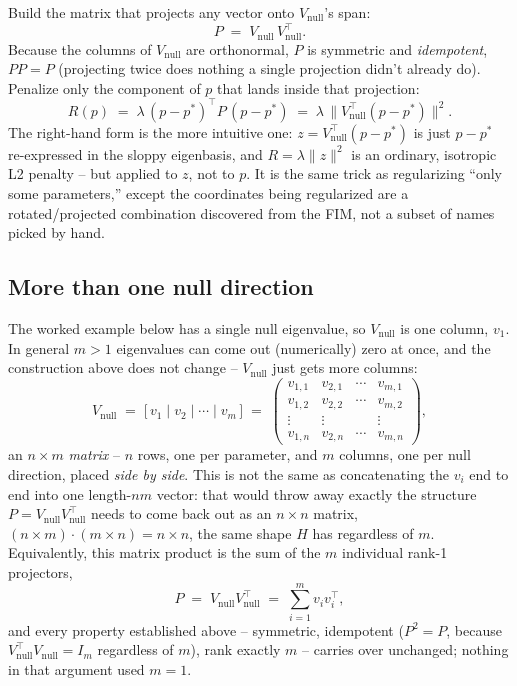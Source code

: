 \documentclass[11pt]{article}
\begin{document}
Build the matrix that projects any vector onto $V_{\mathrm{null}}$'s span:
\begin{equation}
  P \;=\; V_{\mathrm{null}}\,V_{\mathrm{null}}^\top .
\end{equation}
Because the columns of $V_{\mathrm{null}}$ are orthonormal, $P$ is symmetric
and \emph{idempotent}, $PP = P$ (projecting twice does nothing a single
projection didn't already do). Penalize only the component of $p$ that lands
inside that projection:
\begin{equation}
  R(p) \;=\; \lambda\,(p-p^*)^\top P\,(p-p^*) \;=\; \lambda\,\big\lVert V_{\mathrm{null}}^\top (p-p^*) \big\rVert^2 .
\end{equation}
The right-hand form is the more intuitive one: $z = V_{\mathrm{null}}^\top
(p-p^*)$ is just $p-p^*$ re-expressed in the sloppy eigenbasis, and $R =
\lambda\lVert z\rVert^2$ is an ordinary, isotropic L2 penalty -- but applied
to $z$, not to $p$. It is the same trick as regularizing ``only some
parameters,'' except the coordinates being regularized are a
rotated/projected combination discovered from the FIM, not a subset of names
picked by hand.

\subsection*{More than one null direction}

The worked example below has a single null eigenvalue, so $V_{\mathrm{null}}$
is one column, $v_1$. In general $m>1$ eigenvalues can come out
(numerically) zero at once, and the construction above does not change --
$V_{\mathrm{null}}$ just gets more columns:
\begin{equation}
  V_{\mathrm{null}} \;=\; \big[\,v_1 \mid v_2 \mid \cdots \mid v_m\,\big]
  \;=\;
  \begin{pmatrix}
    v_{1,1} & v_{2,1} & \cdots & v_{m,1}\\
    v_{1,2} & v_{2,2} & \cdots & v_{m,2}\\
    \vdots  & \vdots  &        & \vdots \\
    v_{1,n} & v_{2,n} & \cdots & v_{m,n}
  \end{pmatrix},
\end{equation}
an $n\times m$ \emph{matrix} -- $n$ rows, one per parameter, and $m$ columns,
one per null direction, placed \emph{side by side}. This is not the same as
concatenating the $v_i$ end to end into one length-$nm$ vector: that would
throw away exactly the structure $P=V_{\mathrm{null}}V_{\mathrm{null}}^\top$
needs to come back out as an $n\times n$ matrix, $(n\times m)\cdot(m\times
n)=n\times n$, the same shape $H$ has regardless of $m$. Equivalently, this
matrix product is the sum of the $m$ individual rank-1 projectors,
\begin{equation}
  P \;=\; V_{\mathrm{null}}V_{\mathrm{null}}^\top \;=\; \sum_{i=1}^m v_iv_i^\top,
\end{equation}
and every property established above -- symmetric, idempotent ($P^2=P$,
because $V_{\mathrm{null}}^\top V_{\mathrm{null}}=I_m$ regardless of $m$),
rank exactly $m$ -- carries over unchanged; nothing in that argument used
$m=1$.
\end{document}
